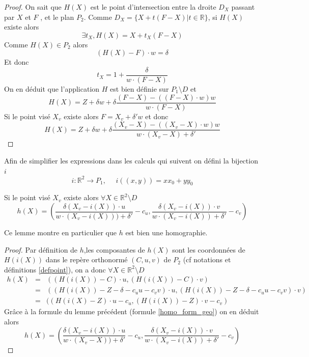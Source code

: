 \begin{proof}
On sait que $H(X)$ est le point d'intersection entre la droite $D_X$ passant par $X$ et $F$ , et le plan $P_2$.
Comme $D_{X}=\{X+t(F-X)|t\in\mathbb{R}\}$, si $H(X)$ existe alors 
\begin{equation*}
\exists t_{X},H(X)=X+t_{X}(F-X)
\end{equation*}
Comme $H(X)\in P_{2}$ alors
\begin{equation*}
(H(X)-F)\cdot w =\delta
\end{equation*}
Et donc 
\begin{equation*}
t_{X}=1+\frac{\delta}{w\cdot(F-X)}
\end{equation*}
 On en déduit que l'application $H$ est bien définie sur $P_{1}\setminus D$ et 
\begin{equation*}
H(X)=Z+\delta w+\delta \frac{(F-X)-\left((F-X)\cdot w\right) w}{w\cdot (F-X)}
\end{equation*}
Si le point visé $X_v$ existe alors  $F=X_v+\delta' w$ et donc
\begin{equation*}
H(X)=Z+\delta w+\delta \frac{(X_v-X)-\left((X_v-X)\cdot w\right) w}{w\cdot (X_v-X)+\delta'}
\end{equation*}
\end{proof}
Afin de simplifier les expressions dans les calculs qui suivent on défini la bijection $i$ 
\begin{equation*}
i:\mathbb{R}^{2}\rightarrow P_{1},~~~~~~i((x,y))=xx_{0}+yy_{0}
\end{equation*}

\begin{lem}Si le point visé $X_v$ existe alors $\forall X\in \mathbb{R}^{2} \setminus D$ 
\begin{equation}
h(X)=\left(\frac{\delta (X_{v}-i(X))\cdot u}{w \cdot (X_{v}-i(X)))+\delta'}-c_{u},\frac{\delta (X_{v}-i(X))\cdot v}{w \cdot (X_{v}-i(X))+\delta'} -c_{v} \right) 
\label{homo_form_analytique}
\end{equation}
\end{lem}
Ce lemme montre en particulier que $h$ est bien une homographie.
\begin{proof}
Par définition de $h$,les composantes de $h(X)$ sont les coordonnées de $H(i(X))$ dans le repère orthonormé $(C,u,v)$ de $P_2$ (cf notations et définitions \ref{defpoint}), on a donc $ \forall X\in \mathbb{R}^{2} \setminus D$
\begin{eqnarray*}
h(X) &=& ((H(i(X))-C)\cdot u, (H(i(X))-C)\cdot v)\\
     &=& ((H(i(X))-Z-\delta -c_u u -c_v v)\cdot u, (H(i(X))-Z-\delta -c_u u -c_v v)\cdot v)\\
     &=& ((H(i(X)-Z)\cdot u -c_u, (H(i(X))-Z)\cdot v - c_v)
\end{eqnarray*}
Grâce à la formule du lemme précédent (formule \ref{homo_form_geo}) on en déduit alors 
\begin{equation*}
h(X)=\left(\frac{\delta (X_{v}-i(X))\cdot u}{w \cdot (X_{v}-X))+\delta'}-c_{u},\frac{\delta (X_{v}-i(X))\cdot v}{w \cdot (X_{v}-i(X))+\delta'} -c_{v} \right) 
\end{equation*}
\end{proof}


